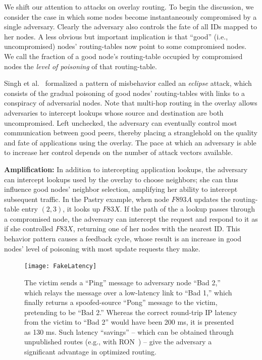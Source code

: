 \documentclass[10pt,twocolumn]{article}
\renewcommand{\paragraph}[1]{\textbf{#1:}}
\begin{document}
\label{sec:eclipses}
We shift our attention to attacks
on overlay routing.
To begin the discussion, we consider the case
in which some nodes become instantaneously compromised by a
single adversary.  Clearly the adversary also controls the fate of all
IDs mapped to her nodes.  A less obvious but 
important implication is that ``good'' (i.e., uncompromised) nodes'
routing-tables now point to some compromised nodes.  We call the
fraction of a good node's routing-table occupied by compromised nodes
the \emph{level of poisoning} of that routing-table.


Singh et al.~\cite{Singh2004} formalized a pattern of misbehavior called 
an \emph{eclipse} attack, which consists of the gradual poisoning of good nodes' 
routing-tables with links to a conspiracy of adversarial nodes. Note
that multi-hop routing in the overlay allows adversaries to intercept lookups
whose source and destination are both uncompromised. Left unchecked,
the adversary can eventually control most communication between good
peers, thereby placing a stranglehold on the quality and fate of
applications using the overlay.  The pace at which an adversary
is able to increase her control depends on the number of attack vectors available.


\paragraph{Amplification} In addition to intercepting application lookups,
the adversary can intercept lookups used by the overlay to choose
neighbors; she can thus influence good nodes'
neighbor selection, amplifying her ability to intercept subsequent traffic.
In the Pastry example, when node $F893A$ updates
the routing-table entry $(2,3)$, it looks up $F83X$.  If the path of the a lookup passes through a
compromised node, the adversary can intercept the request and respond to
it as if she controlled $F83X$, returning one of her nodes with the nearest ID. This behavior 
pattern causes a feedback cycle, whose result is an increase in good nodes' level of poisoning 
with most update requests they make.

\begin{figure}
\centerline{\texttt{[image: FakeLatency]}}
\caption{
  The victim sends a ``Ping'' message to adversary node ``Bad
  2,'' which relays the message over a low-latency link to ``Bad 1,''
  which finally returns a spoofed-source ``Pong'' message to the
  victim, pretending to be ``Bad 2.''  Whereas the correct
  round-trip IP latency from the victim to ``Bad 2''
  would have been 200 ms, it is presented as 130 ms.  Such latency ``savings'' -- which can be obtained
  through unpublished routes (e.g., with
  RON~\cite{Andersen2001}) -- give the adversary a significant advantage in
  optimized routing.}
\label{fig:FakeLatency}
\end{figure}
\end{document}
